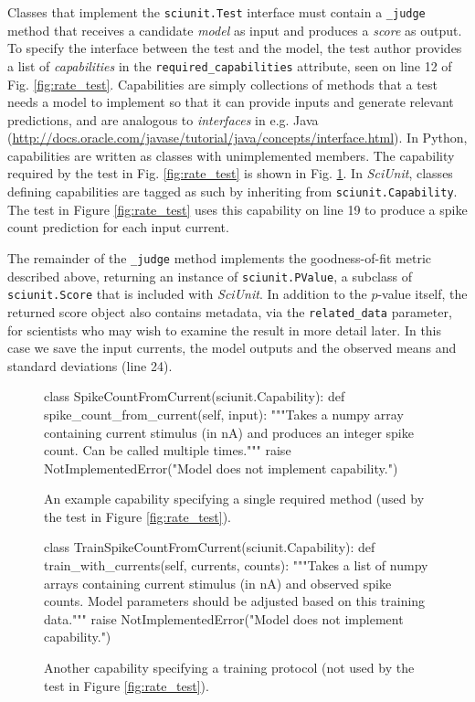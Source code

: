 \documentclass{frontiersSCNS}
\let\verbx\lstinline
\begin{document}
Classes that implement the \verbx{sciunit.Test} interface must contain a \verbx{_judge} method that receives a candidate \emph{model} as input and produces a \textit{score} as output. 
To specify the interface between the test and the model, the test author provides a list of \emph{capabilities} in the \verbx{required_capabilities} attribute, seen on line 12 of Fig. \ref{fig:rate_test}. 
Capabilities are simply collections of methods that a test needs a model to implement so that it can provide inputs and generate relevant predictions, and are analogous to \emph{interfaces} in e.g. Java (\url{http://docs.oracle.com/javase/tutorial/java/concepts/interface.html}). 
In Python, capabilities are written as classes with unimplemented members. 
The capability required by the test in Fig. \ref{fig:rate_test} is shown in Fig. \ref{fig:capability}. 
In \textit{SciUnit}, classes defining capabilities are tagged as such by inheriting from \verbx{sciunit.Capability}. The test in Figure \ref{fig:rate_test} uses this capability on line 19 to produce a spike count prediction for each input current. 

The remainder of the \verbx{_judge} method implements the goodness-of-fit metric described above, returning an instance of \verbx{sciunit.PValue}, a subclass of \verbx{sciunit.Score} that is included with \textit{SciUnit}. In addition to the $p$-value itself, the returned score object also contains metadata, via the \verbx{related_data} parameter, for  scientists who may wish to examine the result in more detail later. 
In this case we save the input currents, the model outputs and the observed means and standard deviations (line 24). 

\begin{figure}
\begin{python}
class SpikeCountFromCurrent(sciunit.Capability):
  def spike_count_from_current(self, input): 
    """Takes a numpy array containing current stimulus (in nA) and
    produces an integer spike count. Can be called multiple times."""
    raise NotImplementedError("Model does not implement capability.")
\end{python}
\vspace{-15px}
\caption{An example capability specifying a single required method (used by the test in Figure \ref{fig:rate_test}).}
\label{fig:capability}
\vspace{-10px}
\end{figure}
\begin{figure}
\begin{python}
class TrainSpikeCountFromCurrent(sciunit.Capability):
  def train_with_currents(self, currents, counts):
    """Takes a list of numpy arrays containing current stimulus (in nA) and
    observed spike counts. Model parameters should be adjusted based on this
    training data."""
    raise NotImplementedError("Model does not implement capability.")
\end{python}
\vspace{-15px}
\caption{Another capability specifying a training protocol (not used by the test in Figure \ref{fig:rate_test}).}
\label{fig:training}
\vspace{-10px}
\end{figure}
\end{document}
